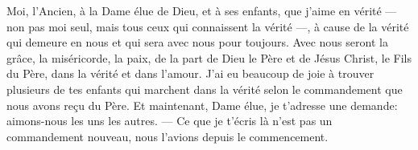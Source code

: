 Moi, l’Ancien, à la Dame élue de Dieu, et à ses enfants, que j’aime en vérité
	--- non pas moi seul, mais tous ceux qui connaissent la vérité ---,
	à cause de la vérité qui demeure en nous
	et qui sera avec nous pour toujours.
Avec nous seront la grâce, la miséricorde, la paix,
	de la part de Dieu le Père et de Jésus Christ, le Fils du Père,
	dans la vérité et dans l’amour.
J’ai eu beaucoup de joie à trouver plusieurs de tes enfants qui marchent dans la vérité
	selon le commandement que nous avons reçu du Père.
Et maintenant, Dame élue, je t’adresse une demande:
	aimons-nous les uns les autres.
--- Ce que je t’écris là n’est pas un commandement nouveau,
	nous l’avions depuis le commencement.
